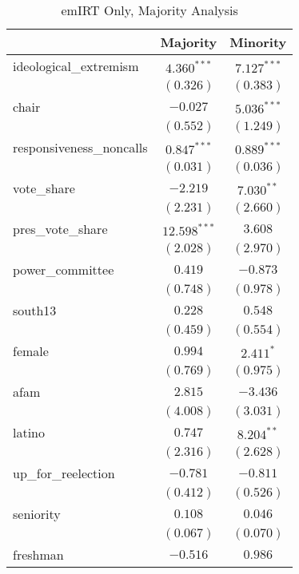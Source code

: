 \documentclass[12pt]{article}
\begin{document}
\begin{table}
	\begin{center}
	\caption{emIRT Only, Majority Analysis}
		\begin{tabular}{l c c }
			\hline
			& Majority & Minority \\
			\hline
			ideological\_extremism   & $4.360^{***}$  & $7.127^{***}$ \\
			& $(0.326)$      & $(0.383)$     \\
			chair                    & $-0.027$       & $5.036^{***}$ \\
			& $(0.552)$      & $(1.249)$     \\
			responsiveness\_noncalls & $0.847^{***}$  & $0.889^{***}$ \\
			& $(0.031)$      & $(0.036)$     \\
			vote\_share              & $-2.219$       & $7.030^{**}$  \\
			& $(2.231)$      & $(2.660)$     \\
			pres\_vote\_share        & $12.598^{***}$ & $3.608$       \\
			& $(2.028)$      & $(2.970)$     \\
			power\_committee         & $0.419$        & $-0.873$      \\
			& $(0.748)$      & $(0.978)$     \\
			south13                  & $0.228$        & $0.548$       \\
			& $(0.459)$      & $(0.554)$     \\
			female                   & $0.994$        & $2.411^{*}$   \\
			& $(0.769)$      & $(0.975)$     \\
			afam                     & $2.815$        & $-3.436$      \\
			& $(4.008)$      & $(3.031)$     \\
			latino                   & $0.747$        & $8.204^{**}$  \\
			& $(2.316)$      & $(2.628)$     \\
			up\_for\_reelection      & $-0.781$       & $-0.811$      \\
			& $(0.412)$      & $(0.526)$     \\
			seniority                & $0.108$        & $0.046$       \\
			& $(0.067)$      & $(0.070)$     \\
			freshman                 & $-0.516$       & $0.986$       \\

\end{tabular}
\end{center}
\end{table}
\end{document}
